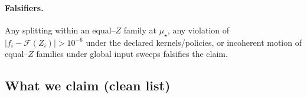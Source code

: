 \documentclass[epjc3]{svjour3}
\begin{document}

\paragraph{Falsifiers.}
Any splitting within an equal–$Z$ family at $\mu_\star$, any violation of $|f_i-\mathcal F(Z_i)|>10^{-6}$ under the declared kernels/policies, or incoherent motion of equal–$Z$ families under global input sweeps falsifies the claim.

\subsection{What we claim (clean list)}
\end{document}
